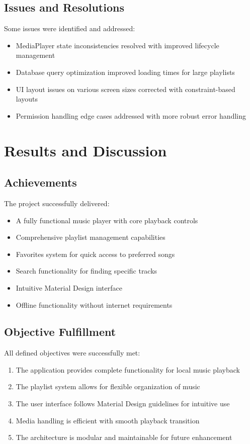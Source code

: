 \documentclass{article}
\begin{document}
\subsection{Issues and Resolutions}
Some issues were identified and addressed:
\begin{itemize}
    \item MediaPlayer state inconsistencies resolved with improved lifecycle management
    \item Database query optimization improved loading times for large playlists
    \item UI layout issues on various screen sizes corrected with constraint-based layouts
    \item Permission handling edge cases addressed with more robust error handling
\end{itemize}

\section{Results and Discussion}
\subsection{Achievements}
The project successfully delivered:
\begin{itemize}
    \item A fully functional music player with core playback controls
    \item Comprehensive playlist management capabilities
    \item Favorites system for quick access to preferred songs
    \item Search functionality for finding specific tracks
    \item Intuitive Material Design interface
    \item Offline functionality without internet requirements
\end{itemize}

\subsection{Objective Fulfillment}
All defined objectives were successfully met:
\begin{enumerate}
    \item The application provides complete functionality for local music playback
    \item The playlist system allows for flexible organization of music
    \item The user interface follows Material Design guidelines for intuitive use
    \item Media handling is efficient with smooth playback transition
    \item The architecture is modular and maintainable for future enhancement
\end{enumerate}
\end{document}
